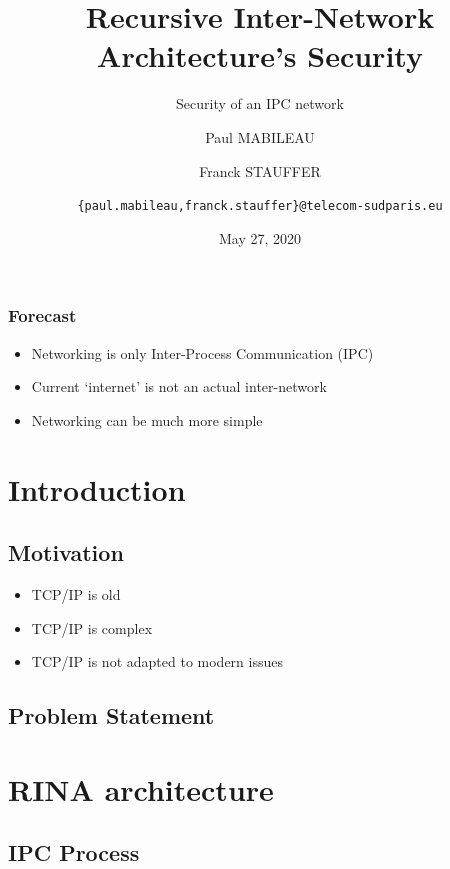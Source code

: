 \documentclass[aspectratio=169]{beamer}
\author[MABILEAU, STAUFFER]{
    Paul MABILEAU
    \and
    Franck STAUFFER
    \and
    \texttt{\{paul.mabileau,franck.stauffer\}@telecom-sudparis.eu}
}
\institute[TSP]{TELECOM SudParis}
\title[RINA's security]{Recursive Inter-Network Architecture's Security}
\subtitle{Security of an IPC network}
\date[2020/05/27]{May 27, 2020}
\begin{document}
\maketitle

\begin{frame}
    \frametitle{Forecast}
    \begin{itemize}
        \item Networking is only Inter-Process Communication (IPC)
        \item Current `internet' is not an actual inter-network
        \item Networking can be much more simple
    \end{itemize}
\end{frame}



\section{Introduction}

\subsection{Motivation}
\begin{frame}
    \begin{itemize}
        \item TCP/IP is old
        \item TCP/IP is complex
        \item TCP/IP is not adapted to modern issues
    \end{itemize}
\end{frame}

\subsection{Problem Statement}


\section{RINA architecture}

\subsection{IPC Process}
\end{document}
